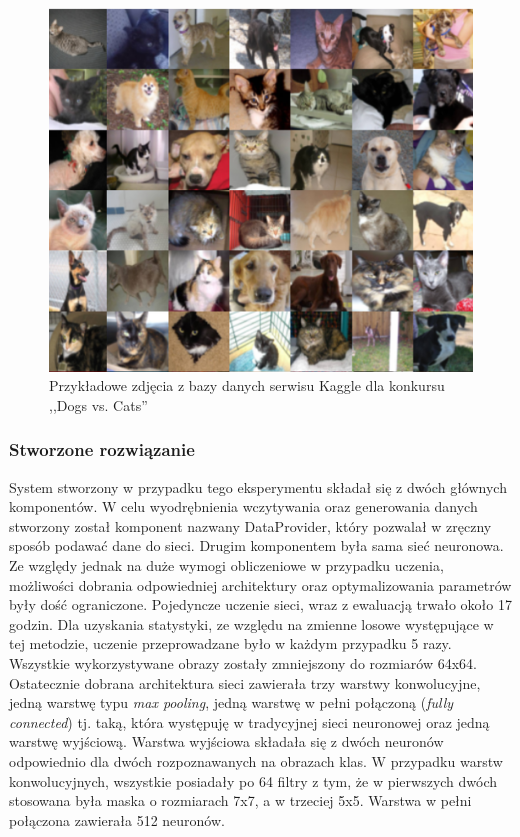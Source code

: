 \begin{figure}[ht!]
\centering
\includegraphics[scale=0.8]{res/catsdogs.png}
\caption[Caption for LOF]{Przykładowe zdjęcia z bazy danych serwisu Kaggle dla konkursu ,,Dogs vs. Cats'' \label{catsdogs}}
\end{figure} 

\subsubsection{Stworzone rozwiązanie}
System stworzony w przypadku tego eksperymentu składał się z dwóch głównych komponentów. W celu wyodrębnienia wczytywania oraz generowania danych stworzony został komponent nazwany DataProvider, który pozwalał w zręczny sposób podawać dane do sieci. Drugim komponentem była sama sieć neuronowa. Ze względy jednak na duże wymogi obliczeniowe w przypadku uczenia, możliwości dobrania odpowiedniej architektury oraz optymalizowania parametrów były dość ograniczone. Pojedyncze uczenie sieci, wraz z ewaluacją trwało około 17 godzin. Dla uzyskania statystyki, ze względu na zmienne losowe występujące w tej metodzie, uczenie przeprowadzane było w każdym przypadku 5 razy. Wszystkie wykorzystywane obrazy zostały zmniejszony do rozmiarów 64x64. Ostatecznie dobrana architektura sieci zawierała trzy warstwy konwolucyjne, jedną warstwę typu \textit{max pooling}, jedną warstwę w pełni połączoną (\textit{fully connected}) tj. taką, która występuję w tradycyjnej sieci neuronowej oraz jedną warstwę wyjściową. Warstwa wyjściowa składała się z dwóch neuronów odpowiednio dla dwóch rozpoznawanych na obrazach klas. W przypadku warstw konwolucyjnych, wszystkie posiadały po 64 filtry z tym, że w pierwszych dwóch stosowana była maska o rozmiarach 7x7, a w trzeciej 5x5.  Warstwa w pełni połączona zawierała 512 neuronów.
